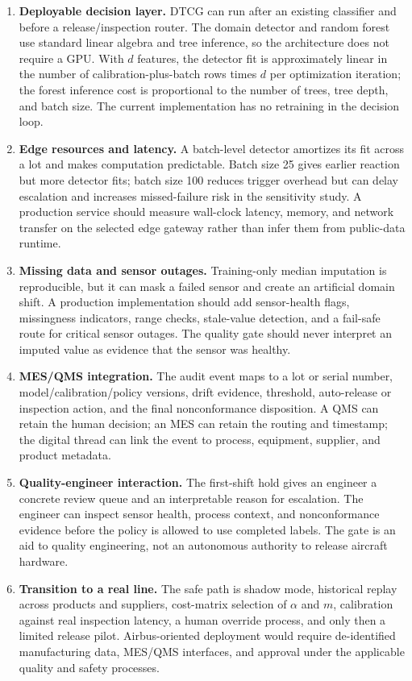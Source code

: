 \documentclass[journal]{IEEEtran}
\begin{document}
\begin{enumerate}
    \item \textbf{Deployable decision layer.} DTCG can run after an existing classifier and before a release/inspection router. The domain detector and random forest use standard linear algebra and tree inference, so the architecture does not require a GPU. With $d$ features, the detector fit is approximately linear in the number of calibration-plus-batch rows times $d$ per optimization iteration; the forest inference cost is proportional to the number of trees, tree depth, and batch size. The current implementation has no retraining in the decision loop.
    \item \textbf{Edge resources and latency.} A batch-level detector amortizes its fit across a lot and makes computation predictable. Batch size 25 gives earlier reaction but more detector fits; batch size 100 reduces trigger overhead but can delay escalation and increases missed-failure risk in the sensitivity study. A production service should measure wall-clock latency, memory, and network transfer on the selected edge gateway rather than infer them from public-data runtime.
    \item \textbf{Missing data and sensor outages.} Training-only median imputation is reproducible, but it can mask a failed sensor and create an artificial domain shift. A production implementation should add sensor-health flags, missingness indicators, range checks, stale-value detection, and a fail-safe route for critical sensor outages. The quality gate should never interpret an imputed value as evidence that the sensor was healthy.
    \item \textbf{MES/QMS integration.} The audit event maps to a lot or serial number, model/calibration/policy versions, drift evidence, threshold, auto-release or inspection action, and the final nonconformance disposition. A QMS can retain the human decision; an MES can retain the routing and timestamp; the digital thread can link the event to process, equipment, supplier, and product metadata.
    \item \textbf{Quality-engineer interaction.} The first-shift hold gives an engineer a concrete review queue and an interpretable reason for escalation. The engineer can inspect sensor health, process context, and nonconformance evidence before the policy is allowed to use completed labels. The gate is an aid to quality engineering, not an autonomous authority to release aircraft hardware.
    \item \textbf{Transition to a real line.} The safe path is shadow mode, historical replay across products and suppliers, cost-matrix selection of $\alpha$ and $m$, calibration against real inspection latency, a human override process, and only then a limited release pilot. Airbus-oriented deployment would require de-identified manufacturing data, MES/QMS interfaces, and approval under the applicable quality and safety processes.
\end{enumerate}
\end{document}
